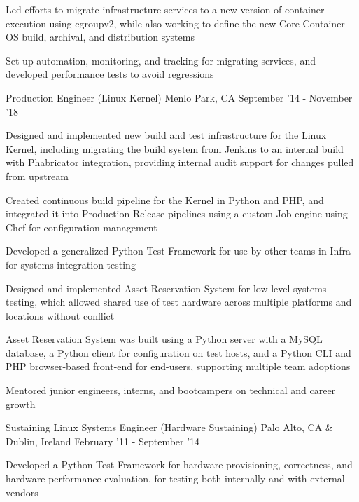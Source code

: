 \begin{cventries}
{\begin{cvitems}
		  \item Led efforts to migrate infrastructure services to a new version of container execution using cgroupv2, while also working to define the new Core Container OS build, archival, and distribution systems
		  \item Set up automation, monitoring, and tracking for migrating services, and developed performance tests to avoid regressions
        \end{cvitems}
    }
\vspace{0mm}
\cventry
	{Production Engineer \color{solarized-orange}(Linux Kernel)} %
    {} %
    {Menlo Park, CA} %
    {September '14 - November '18} %
    {
        \begin{cvitems}
		  \item Designed and implemented new build and test infrastructure for the Linux Kernel, including migrating the build system from Jenkins to an internal build with Phabricator integration, providing internal audit support for changes pulled from upstream
		  \item Created continuous build pipeline for the Kernel in Python and PHP, and integrated it into Production Release pipelines using a custom Job engine using Chef for configuration management
		  \item Developed a generalized Python Test Framework for use by other teams in Infra for systems integration testing
		  \item Designed and implemented Asset Reservation System for low-level systems testing, which allowed shared use of test hardware across multiple platforms and locations without conflict
		  \item Asset Reservation System was built using a Python server with a MySQL database, a Python client for configuration on test hosts, and a Python CLI and PHP browser-based front-end for end-users, supporting multiple team adoptions
          \item Mentored junior engineers, interns, and bootcampers on technical and career growth
        \end{cvitems}
    }
\vspace{0mm}
\cventry
	{Sustaining Linux Systems Engineer \color{solarized-orange}(Hardware Sustaining)} %
    {} %
	{Palo Alto, CA \& Dublin, Ireland} %
    {February '11 - September '14} %
    {
        \begin{cvitems}
		  \item Developed a Python Test Framework for hardware provisioning, correctness, and hardware performance evaluation, for testing both internally and with external vendors

\end{cvitems}}
\end{cventries}
